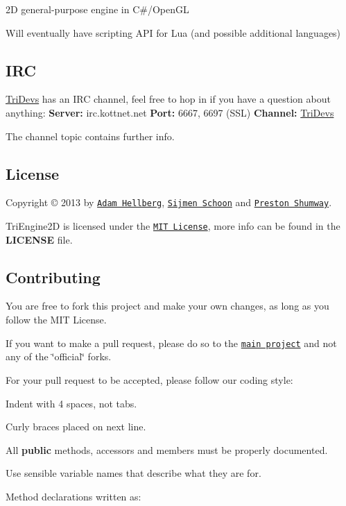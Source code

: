 2\-D general-\/purpose engine in C\#/\-Open\-G\-L

Will eventually have scripting A\-P\-I for Lua (and possible additional languages)

\subsection*{I\-R\-C}

\hyperlink{namespace_tri_devs}{Tri\-Devs} has an I\-R\-C channel, feel free to hop in if you have a question about anything\-: {\bfseries Server\-:} irc.\-kottnet.\-net {\bfseries Port\-:} 6667, 6697 (S\-S\-L) {\bfseries Channel\-:} \hyperlink{namespace_tri_devs}{Tri\-Devs}

The channel topic contains further info.

\subsection*{License}

Copyright © 2013 by \href{https://github.com/Sharparam}{\tt Adam Hellberg}, \href{https://github.com/Vijfhoek}{\tt Sijmen Schoon} and \href{https://github.com/anidude}{\tt Preston Shumway}.

Tri\-Engine2\-D is licensed under the \href{http://opensource.org/licenses/MIT}{\tt M\-I\-T License}, more info can be found in the {\bfseries L\-I\-C\-E\-N\-S\-E} file.

\subsection*{Contributing}

You are free to fork this project and make your own changes, as long as you follow the M\-I\-T License.

If you want to make a pull request, please do so to the \href{https://github.com/TriDevs/TriEngine2D}{\tt main project} and not any of the \char`\"{}official\char`\"{} forks.

For your pull request to be accepted, please follow our coding style\-:
\begin{DoxyItemize}
\item Indent with 4 spaces, not tabs.
\item Curly braces placed on next line.
\item All {\bfseries public} methods, accessors and members must be properly documented.
\item Use sensible variable names that describe what they are for.
\item Method declarations written as\-:
\end{DoxyItemize}

